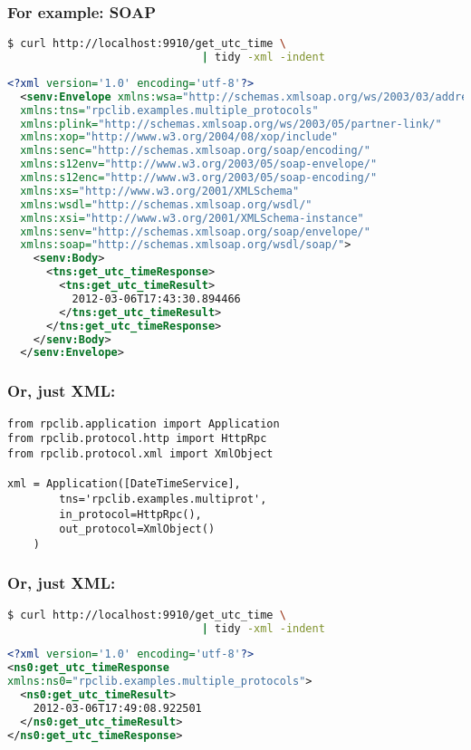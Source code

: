 \documentclass{beamer}
\begin{document}
\begin{frame}[fragile]
  \frametitle{For example: SOAP}

  \begin{lstlisting}[language=sh,frame=topline]
$ curl http://localhost:9910/get_utc_time \
                              | tidy -xml -indent
  \end{lstlisting}
  \tiny
  \begin{lstlisting}[language=xml,frame=bottomline]
  <?xml version='1.0' encoding='utf-8'?>
  <senv:Envelope xmlns:wsa="http://schemas.xmlsoap.org/ws/2003/03/addressing"
  xmlns:tns="rpclib.examples.multiple_protocols"
  xmlns:plink="http://schemas.xmlsoap.org/ws/2003/05/partner-link/"
  xmlns:xop="http://www.w3.org/2004/08/xop/include"
  xmlns:senc="http://schemas.xmlsoap.org/soap/encoding/"
  xmlns:s12env="http://www.w3.org/2003/05/soap-envelope/"
  xmlns:s12enc="http://www.w3.org/2003/05/soap-encoding/"
  xmlns:xs="http://www.w3.org/2001/XMLSchema"
  xmlns:wsdl="http://schemas.xmlsoap.org/wsdl/"
  xmlns:xsi="http://www.w3.org/2001/XMLSchema-instance"
  xmlns:senv="http://schemas.xmlsoap.org/soap/envelope/"
  xmlns:soap="http://schemas.xmlsoap.org/wsdl/soap/">
    <senv:Body>
      <tns:get_utc_timeResponse>
        <tns:get_utc_timeResult>
          2012-03-06T17:43:30.894466
        </tns:get_utc_timeResult>
      </tns:get_utc_timeResponse>
    </senv:Body>
  </senv:Envelope>
  \end{lstlisting}
\end{frame}

\begin{frame}[fragile]
  \frametitle{Or, just XML:}

  \begin{lstlisting}
from rpclib.application import Application
from rpclib.protocol.http import HttpRpc
from rpclib.protocol.xml import XmlObject

xml = Application([DateTimeService],
        tns='rpclib.examples.multiprot',
        in_protocol=HttpRpc(),
        out_protocol=XmlObject()
    )
  \end{lstlisting}
\end{frame}


\begin{frame}[fragile]
  \frametitle{Or, just XML:}

  \begin{lstlisting}[language=sh,frame=topline]
$ curl http://localhost:9910/get_utc_time \
                              | tidy -xml -indent
  \end{lstlisting}
  \small
  \begin{lstlisting}[language=xml,frame=bottomline]
<?xml version='1.0' encoding='utf-8'?>
<ns0:get_utc_timeResponse
xmlns:ns0="rpclib.examples.multiple_protocols">
  <ns0:get_utc_timeResult>
    2012-03-06T17:49:08.922501
  </ns0:get_utc_timeResult>
</ns0:get_utc_timeResponse>
  \end{lstlisting}
\end{frame}
\end{document}
